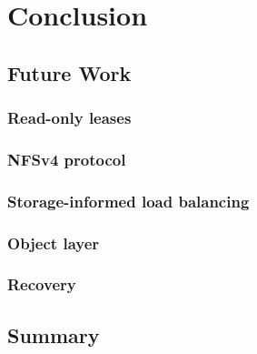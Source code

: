 \chapter{Conclusion}

\section{Future Work}
\subsection{Read-only leases}
\subsection{NFSv4 protocol}
\subsection{Storage-informed load balancing}
\subsection{Object layer}
\subsection{Recovery}

\section{Summary}